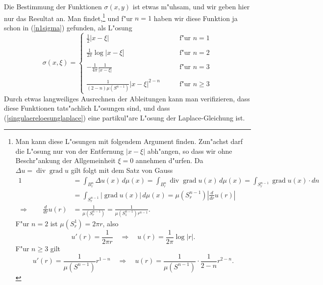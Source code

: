 Die Bestimmung der Funktionen $\sigma(x,y)$ ist etwas m"uhsam, und wir
geben hier nur das Resultat an.
Man findet,\footnote{Man kann
diese L"osungen mit folgendem Argument finden. Zun"achst darf die L"osung
nur von der Entfernung $|x-\xi|$ abh"angen, so dass wir ohne
Beschr"ankung der Allgemeinheit $\xi=0$ annehmen d"urfen.
Da $\Delta u=\operatorname{div}\operatorname{grad}u$ gilt folgt mit
dem Satz von Gauss
\begin{align*}
1&=\int_{B_r^n} \Delta u(x)\,d\mu(x)
=
\int_{B_r^n} \operatorname{div}\operatorname{grad} u(x)\,d\mu(x)
=\int_{S_r^{n-1}}\operatorname{grad}u(x)\cdot dn
\\
&=\int_{S_r^{n-1}}|\operatorname{grad}u(x)|\,d\mu(x)
=\mu(S_r^{n-1})\left|\frac{d}{dr}u(r)\right|
\\
\Rightarrow\qquad\frac{d}{dr}u(r)
&=\frac1{\mu(S_r^{n-1})}
=\frac1{\mu(S_1^{n-1})r^{n-1}}.
\end{align*}
F"ur $n=2$ ist $\mu(S_r^1)=2\pi r$, also
\[
u'(r)=\frac1{2\pi r}\quad\Rightarrow\quad u(r)=\frac1{2\pi}\log|r|.
\]
F"ur $n\ge 3$ gilt
\[
u'(r)=\frac1{\mu(S^{n-1})}r^{1-n}\quad\Rightarrow\quad u(r)=\frac1{\mu(S^{n-1})}\cdot \frac1{2-n}r^{2-n}.
\]
} und f"ur $n=1$ haben wir diese Funktion ja schon in (\ref{n1sigma})
gefunden,
als L"osung
\begin{equation}
\sigma(x,\xi)=
\begin{cases}
\displaystyle \frac12|x-\xi|
&\qquad \text{f"ur $n=1$}
\\
\\
\displaystyle \frac1{2\pi}\log|x-\xi]
&\qquad \text{f"ur $n=2$}
\\
\\
\displaystyle -\frac1{4\pi}\frac1{|x-\xi|}
&\qquad \text{f"ur $n= 3$}
\\
\\
\displaystyle \frac1{(2-n)\mu(S^{n-1})}|x-\xi|^{2-n}
&\qquad \text{f"ur $n\ge 3$}
\end{cases}
\end{equation}
Durch etwas langweiliges Ausrechnen der Ableitungen kann man verifizieren,
dass diese Funktionen tats"achlich L"osungen sind, und dass
(\ref{singulaereloesunglaplace}) eine partikul"are L"osung der
Laplace-Gleichung ist.

